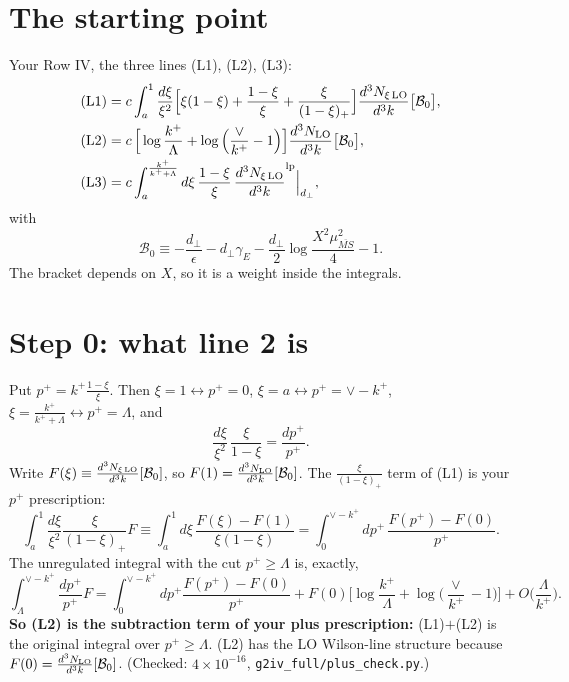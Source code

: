 \documentclass[10pt]{article}
\numberwithin{equation}{section}
\newcommand{\MSb}{\overline{MS}}
\newcommand{\NLO}[1]{\frac{d^3N_{#1}}{d^3k}}
\begin{document}
\section{The starting point}
Your Row IV, the three lines (L1), (L2), (L3):
\begin{align}
\text{(L1)}&=c\int_a^1\frac{d\xi}{\xi^2}\Big[\xi(1-\xi)+\frac{1-\xi}{\xi}+\frac{\xi}{(1-\xi)_+}\Big]\NLO{\xi\,\rm LO}\big[\mathcal B_0\big],\notag\\
\text{(L2)}&=c\,\Big[\log\frac{k^+}{\Lambda}+\log\Big(\frac{\vee}{k^+}-1\Big)\Big]\NLO{\rm LO}\big[\mathcal B_0\big],\notag\\
\text{(L3)}&=c\int_a^{\frac{k^+}{k^++\Lambda}}d\xi\,\frac{1-\xi}{\xi}\,\NLO{\xi\,\rm LO}^{\rm lp}\Big|_{d_\perp},\label{eq:start}
\end{align}
with
\begin{equation}
\mathcal B_0\equiv-\frac{d_\perp}{\epsilon}-d_\perp\gamma_E-\frac{d_\perp}{2}\log\frac{X^2\mu^2_{\MSb}}{4}-1 .
\end{equation}
The bracket depends on $X$, so it is a weight inside the integrals.

\section{Step 0: what line 2 is}
Put $p^+=k^+\frac{1-\xi}{\xi}$. Then $\xi=1\leftrightarrow p^+=0$, $\xi=a\leftrightarrow p^+=\vee-k^+$, $\xi=\frac{k^+}{k^++\Lambda}\leftrightarrow p^+=\Lambda$, and
\begin{equation}
\frac{d\xi}{\xi^2}\,\frac{\xi}{1-\xi}=\frac{dp^+}{p^+}.
\end{equation}
Write $F(\xi)\equiv\NLO{\xi\,\rm LO}[\mathcal B_0]$, so $F(1)=\NLO{\rm LO}[\mathcal B_0]$. The $\frac{\xi}{(1-\xi)_+}$ term of (L1) is your $p^+$ prescription:
\begin{equation}
\int_a^1\frac{d\xi}{\xi^2}\frac{\xi}{(1-\xi)_+}F\equiv\int_a^1d\xi\,\frac{F(\xi)-F(1)}{\xi(1-\xi)}=\int_0^{\vee-k^+}dp^+\,\frac{F(p^+)-F(0)}{p^+}.\label{eq:yours}
\end{equation}
The unregulated integral with the cut $p^+\ge\Lambda$ is, exactly,
\begin{equation}
\int_\Lambda^{\vee-k^+}\frac{dp^+}{p^+}F=\int_0^{\vee-k^+}dp^+\frac{F(p^+)-F(0)}{p^+}+F(0)\Big[\log\frac{k^+}{\Lambda}+\log\Big(\frac{\vee}{k^+}-1\Big)\Big]+O\Big(\frac{\Lambda}{k^+}\Big).
\end{equation}
\textbf{So (L2) is the subtraction term of your plus prescription:} (L1)$+$(L2) is the original integral over $p^+\ge\Lambda$. (L2) has the LO Wilson-line structure because $F(0)=\NLO{\rm LO}[\mathcal B_0]$. (Checked: $4\times10^{-16}$, \texttt{g2iv\_full/plus\_check.py}.)
\end{document}
